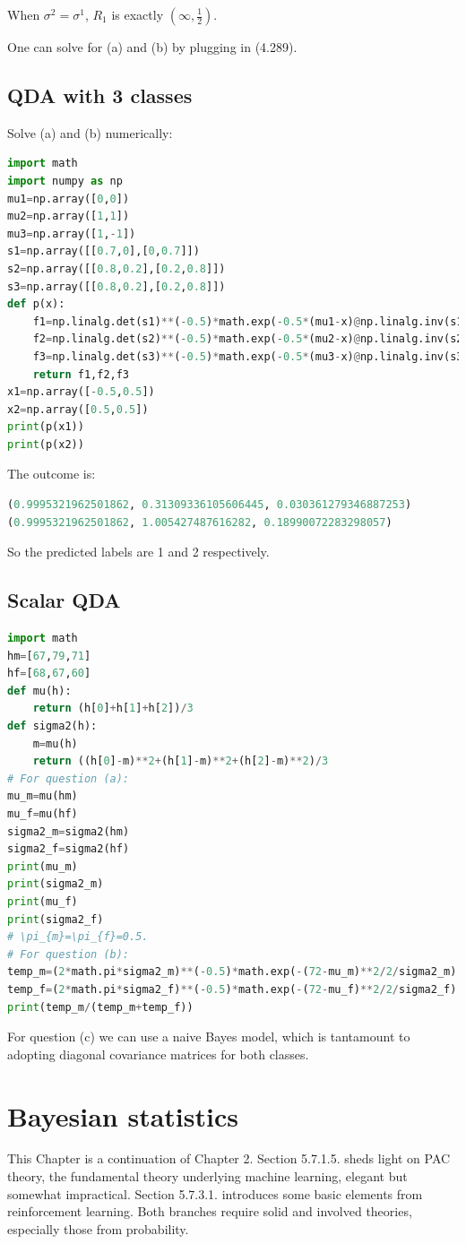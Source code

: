 \documentclass[UTF8]{ctexart}
\begin{document}
When $\sigma^{2}=\sigma^{1}$, $R_{1}$ is exactly $(\infty,\frac{1}{2})$.

One can solve for (a) and (b) by plugging in (4.289).

\subsection{QDA with 3 classes}
Solve (a) and (b) numerically:
\begin{lstlisting}[language=Python]
import math
import numpy as np
mu1=np.array([0,0])
mu2=np.array([1,1])
mu3=np.array([1,-1])
s1=np.array([[0.7,0],[0,0.7]])
s2=np.array([[0.8,0.2],[0.2,0.8]])
s3=np.array([[0.8,0.2],[0.2,0.8]])
def p(x):
    f1=np.linalg.det(s1)**(-0.5)*math.exp(-0.5*(mu1-x)@np.linalg.inv(s1)@(mu1-x))
    f2=np.linalg.det(s2)**(-0.5)*math.exp(-0.5*(mu2-x)@np.linalg.inv(s2)@(mu2-x))
    f3=np.linalg.det(s3)**(-0.5)*math.exp(-0.5*(mu3-x)@np.linalg.inv(s3)@(mu3-x))
    return f1,f2,f3
x1=np.array([-0.5,0.5])
x2=np.array([0.5,0.5])
print(p(x1))
print(p(x2))
\end{lstlisting}
The outcome is:
\begin{lstlisting}[language=Python]
(0.9995321962501862, 0.31309336105606445, 0.030361279346887253)
(0.9995321962501862, 1.005427487616282, 0.18990072283298057)
\end{lstlisting}
So the predicted labels are 1 and 2 respectively.


\subsection{Scalar QDA}
\begin{lstlisting}[language=Python]
import math
hm=[67,79,71]
hf=[68,67,60]
def mu(h):
    return (h[0]+h[1]+h[2])/3
def sigma2(h):
    m=mu(h)
    return ((h[0]-m)**2+(h[1]-m)**2+(h[2]-m)**2)/3
# For question (a):
mu_m=mu(hm)
mu_f=mu(hf)
sigma2_m=sigma2(hm)
sigma2_f=sigma2(hf)
print(mu_m)
print(sigma2_m)
print(mu_f)
print(sigma2_f)
# \pi_{m}=\pi_{f}=0.5.
# For question (b):
temp_m=(2*math.pi*sigma2_m)**(-0.5)*math.exp(-(72-mu_m)**2/2/sigma2_m)
temp_f=(2*math.pi*sigma2_f)**(-0.5)*math.exp(-(72-mu_f)**2/2/sigma2_f)
print(temp_m/(temp_m+temp_f))
\end{lstlisting}
For question (c) we can use a naive Bayes model, which is tantamount to adopting diagonal covariance matrices for both classes.


\newpage
\section{Bayesian statistics}
This Chapter is a continuation of Chapter 2.
Section 5.7.1.5. sheds light on PAC theory, the fundamental theory underlying machine learning, elegant but somewhat impractical.
Section 5.7.3.1. introduces some basic elements from reinforcement learning.
Both branches require solid and involved theories, especially those from probability.
\end{document}
